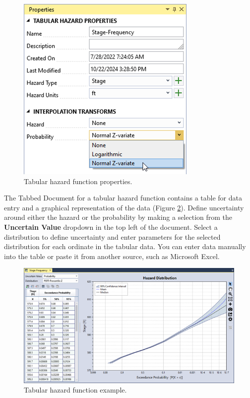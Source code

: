 \documentclass[
]{book}
\begin{document}
\begin{figure}

{\centering \includegraphics{images/figure68} 

}

\caption{Tabular hazard function properties.}\label{fig:figure-68}
\end{figure}

The Tabbed Document for a tabular hazard function contains a table for data entry and a graphical representation of the data (Figure \ref{fig:figure-69}). Define uncertainty around either the hazard or the probability by making a selection from the \textbf{Uncertain Value} dropdown in the top left of the document. Select a distribution to define uncertainty and enter parameters for the selected distribution for each ordinate in the tabular data. You can enter data manually into the table or paste it from another source, such as Microsoft Excel.

\begin{figure}

{\centering \includegraphics{images/figure69} 

}

\caption{Tabular hazard function example.}\label{fig:figure-69}
\end{figure}
\end{document}
